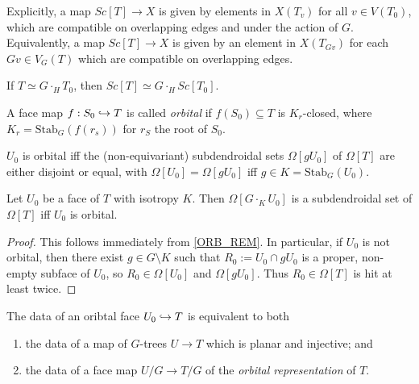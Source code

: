 \documentclass[a4paper,10pt,draft]{article}%
\begin{document}
\begin{remark}
      Explicitly, a map $Sc[T] \to X$ is given by elements in
      $X(T_v)$
      for all $v \in V(T_0)$,
      which are compatible on overlapping edges and under the action of $G$.
      Equivalently, a map $Sc[T] \to X$ is given by an element in $X(T_{G v})$ for each $G v \in V_G(T)$
      which are compatible on overlapping edges.
\end{remark}

\begin{remark}
      If $T \simeq G \cdot_H T_0$, then
      $Sc[T] \simeq G \cdot_H Sc[T_0]$.
\end{remark}


\begin{definition}
      A face map $f:S_0 \hookrightarrow T$ is called \textit{orbital} if
      $f(S_0) \subseteq T$ is $K_r$-closed, where $K_r = \mathrm{Stab}_G(f(r_s))$ for $r_S$ the root of $S_0$.
\end{definition}

\begin{remark}
      \label{ORB_REM}
      $U_0$ is orbital iff the (non-equivariant) subdendroidal sets $\Omega[g U_0]$ of $\Omega[T]$ are either
      disjoint or equal, with $\Omega[U_0] = \Omega[g U_0]$ iff $g \in K = \mathrm{Stab}_G(U_0)$.
\end{remark}

\begin{lemma}
      \label{ORB_INJ_THM}
      Let $U_0$ be a face of $T$ with isotropy $K$.
      Then $\Omega[G \cdot_K U_0]$ is a subdendroidal set of $\Omega[T]$
      iff
      $U_0$ is orbital.
\end{lemma}
\begin{proof}
      This follows immediately from \cref{ORB_REM}.
      In particular, 
      if $U_0$ is not orbital, then there exist $g \in G \setminus K$ such that
      $R_0 := U_0 \cap g U_0$ is a proper, non-empty subface of $U_0$, so $R_0 \in \Omega[U_0]$ and $\Omega[g U_0]$.
      Thus $R_0 \in \Omega[T]$ is hit at least twice.
\end{proof}

\begin{remark}
      The data of an oribtal face $U_0 \hookrightarrow T$ is equivalent to both
      \begin{enumerate}
      \item the data of a map of $G$-trees $U \to T$ which is planar and injective; and
      \item the data of a face map $U/G \to T/G$ of the \textit{orbital representation} of $T$.
      \end{enumerate}
\end{remark}
\end{document}
